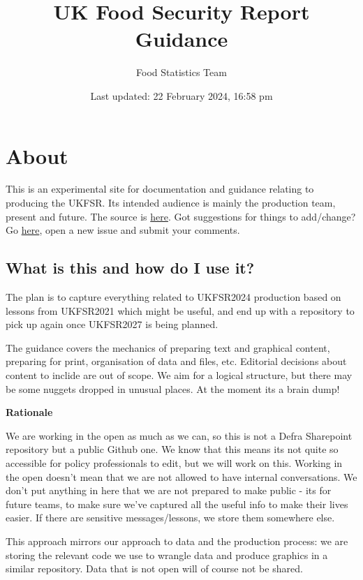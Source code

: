 \documentclass[
]{book}
\title{UK Food Security Report Guidance}
\author{Food Statistics Team}
\date{Last updated: 22 February 2024, 16:58 pm}
\begin{document}
\maketitle

{
\setcounter{tocdepth}{1}
\tableofcontents
}
\hypertarget{about}{%
\chapter{About}\label{about}}

This is an experimental site for documentation and guidance relating to
producing the UKFSR. Its intended audience is mainly the production team,
present and future. The source is
\href{https://github.com/FoodchainStats/ukfsr-docs}{here}. Got suggestions for things
to add/change? Go \href{https://github.com/FoodchainStats/ukfsr-docs/issues}{here},
open a new issue and submit your comments.

\hypertarget{what-is-this-and-how-do-i-use-it}{%
\section{What is this and how do I use it?}\label{what-is-this-and-how-do-i-use-it}}

The plan is to capture everything related to UKFSR2024 production based on
lessons from UKFSR2021 which might be useful, and end up with a repository to
pick up again once UKFSR2027 is being planned.

The guidance covers the mechanics of preparing text and graphical content,
preparing for print, organisation of data and files, etc. Editorial decisions
about content to inclide are out of scope. We aim for a logical structure, but
there may be some nuggets dropped in unusual places. At the moment its a brain
dump!

\textbf{Rationale}

We are working in the open as much as we can, so this is not a Defra Sharepoint
repository but a public Github one. We know that this means its not quite so
accessible for policy professionals to edit, but we will work on this. Working
in the open doesn't mean that we are not allowed to have internal conversations.
We don't put anything in here that we are not prepared to make public - its for
future teams, to make sure we've captured all the useful info to make their
lives easier. If there are sensitive messages/lessons, we store them somewhere
else.

This approach mirrors our approach to data and the production process: we are
storing the relevant code we use to wrangle data and produce graphics in a
similar repository. Data that is not open will of course not be shared.
\end{document}
